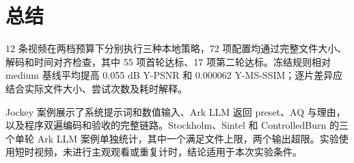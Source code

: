 \documentclass[UTF8,12pt,a4paper,twocolumn]{ctexart}
\begin{document}
\section{总结}
12 条视频在两档预算下分别执行三种本地策略，72 项配置均通过完整文件大小、解码和时间对齐检查，其中 55 项首轮达标、17 项第二轮达标。冻结规则相对 medium 基线平均提高 0.055 dB Y-PSNR 和 0.000062 Y-MS-SSIM；逐片差异应结合实际文件大小、尝试次数及耗时解释。

Jockey 案例展示了系统提示词和数值输入、Ark LLM 返回 preset、AQ 与理由，以及程序双遍编码和验收的完整链路。Stockholm、Sintel 和 ControlledBurn 的三个单轮 Ark LLM 案例单独统计，其中一个满足文件上限，两个输出超限。实验使用短时视频，未进行主观观看或重复计时，结论适用于本次实验条件。
\end{document}

